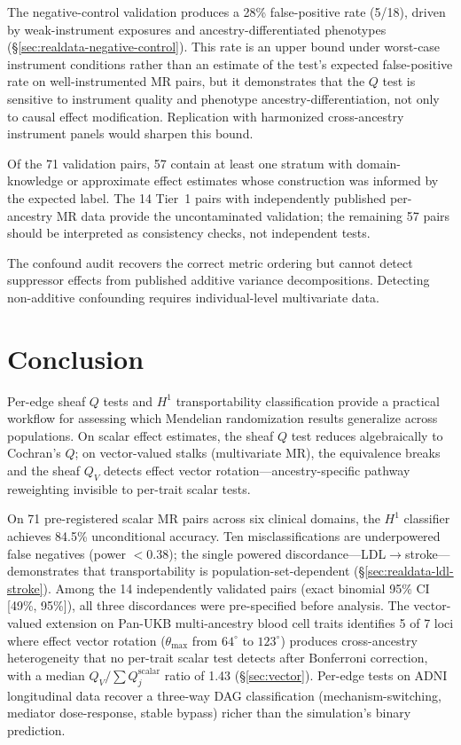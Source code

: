 \documentclass[11pt]{article}
\begin{document}
The negative-control validation produces a 28\% false-positive rate (5/18), driven by weak-instrument exposures and ancestry-differentiated phenotypes (\S\ref{sec:realdata-negative-control}). This rate is an upper bound under worst-case instrument conditions rather than an estimate of the test's expected false-positive rate on well-instrumented MR pairs, but it demonstrates that the $Q$ test is sensitive to instrument quality and phenotype ancestry-differentiation, not only to causal effect modification. Replication with harmonized cross-ancestry instrument panels would sharpen this bound.

Of the 71 validation pairs, 57 contain at least one stratum with domain-knowledge or approximate effect estimates whose construction was informed by the expected label. The 14 Tier~1 pairs with independently published per-ancestry MR data provide the uncontaminated validation; the remaining 57 pairs should be interpreted as consistency checks, not independent tests.

The confound audit recovers the correct metric ordering but cannot detect suppressor effects from published additive variance decompositions.
Detecting non-additive confounding requires individual-level multivariate data.

\section{Conclusion}
\label{sec:conclusion}

Per-edge sheaf $Q$ tests and $H^1$ transportability classification provide a practical workflow for assessing which Mendelian randomization results generalize across populations. On scalar effect estimates, the sheaf $Q$ test reduces algebraically to Cochran's $Q$; on vector-valued stalks (multivariate MR), the equivalence breaks and the sheaf $Q_V$ detects effect vector rotation---ancestry-specific pathway reweighting invisible to per-trait scalar tests.

On 71 pre-registered scalar MR pairs across six clinical domains, the $H^1$ classifier achieves 84.5\% unconditional accuracy. Ten misclassifications are underpowered false negatives (power $< 0.38$); the single powered discordance---LDL$\to$stroke---demonstrates that transportability is population-set-dependent (\S\ref{sec:realdata-ldl-stroke}). Among the 14 independently validated pairs (exact binomial 95\% CI [49\%, 95\%]), all three discordances were pre-specified before analysis.
The vector-valued extension on Pan-UKB multi-ancestry blood cell traits identifies 5 of 7 loci where effect vector rotation ($\theta_{\max}$ from $64^\circ$ to $123^\circ$) produces cross-ancestry heterogeneity that no per-trait scalar test detects after Bonferroni correction, with a median $Q_V / \sum Q_j^{\mathrm{scalar}}$ ratio of 1.43 (\S\ref{sec:vector}).
Per-edge tests on ADNI longitudinal data recover a three-way DAG classification (mechanism-switching, mediator dose-response, stable bypass) richer than the simulation's binary prediction.
\end{document}
